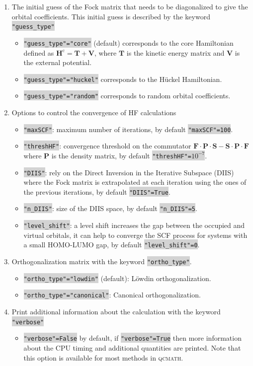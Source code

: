 \documentclass[aip,jcp,reprint,noshowkeys,superscriptaddress]{revtex4-1}
\newcommand{\HcMat}{\bm{H}^\text{c}}
\newcommand{\TMat}{\bm{T}}
\newcommand{\VMat}{\bm{V}}
\newcommand{\qcmath}{\textsc{qcmath}\xspace}
\newcommand{\keyword}[1]{{\colorbox{lightgray}{\texttt{#1}}}}
\begin{document}
\begin{enumerate}
	\item The initial guess of the Fock matrix that needs to be diagonalized to give the orbital coefficients. This initial guess is described by the keyword \keyword{"guess\_type"}
    \begin{itemize}
    	\item \keyword{"guess\_type"="core"} (default) corresponds to the core Hamiltonian defined as $\HcMat = \TMat + \VMat$, where $\TMat$ is the kinetic energy matrix and $\VMat$ is the external potential.
    	\item \keyword{"guess\_type"="huckel"}  corresponds to the H\"uckel Hamiltonian.
    	\item \keyword{"guess\_type"="random"}  corresponds to random orbital coefficients.
    \end{itemize}
	\item Options to control the convergence of HF calculations
    \begin{itemize}
	    \item \keyword{"maxSCF"}: maximum number of iterations, by default \keyword{"maxSCF"=100}.
		\item \keyword{"threshHF"}: convergence threshold on the commutator $\boldsymbol{F} \cdot \boldsymbol{P} \cdot \boldsymbol{S} - \boldsymbol{S} \cdot \boldsymbol{P} \cdot \boldsymbol{F}$ where $\boldsymbol{P}$ is the density matrix, by default \keyword{"threshHF"=$10^{-7}$}.
    	\item \keyword{"DIIS"}: rely on the Direct Inversion in the Iterative Subspace (DIIS) where the Fock matrix is extrapolated at each iteration using the ones of the previous iterations, by default \keyword{"DIIS"=True}.
    	\item \keyword{"n\_DIIS"}: size of the DIIS space, by default \keyword{"n\_DIIS"=5}.
    	\item \keyword{"level\_shift"}: a level shift increases the gap between the occupied and virtual orbitals, it can help to converge the SCF process for systems with a small HOMO-LUMO gap, by default \keyword{"level\_shift"=0}.
    \end{itemize}
	\item Orthogonalization matrix with the keyword \keyword{"ortho\_type"}.
    \begin{itemize}
		\item \keyword{"ortho\_type"="lowdin"} (default): L\"owdin orthogonalization.
	    \item \keyword{"ortho\_type"="canonical"}: Canonical orthogonalization. 
    \end{itemize}
	\item Print additional information about the calculation with the keyword \keyword{"verbose"}
	\begin{itemize}
		\item \keyword{"verbose"=False} by default, if \keyword{"verbose"=True} then more information about the CPU timing and additional quantities are printed. Note that this option is available for most methods in \qcmath.
	\end{itemize}
\end{enumerate}
\end{document}
